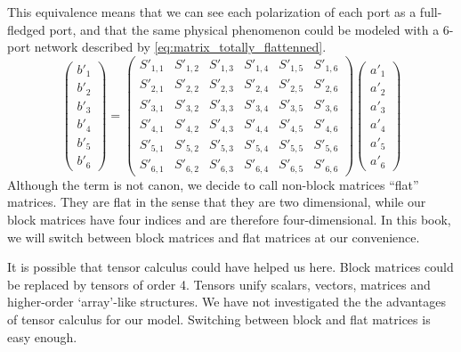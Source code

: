 This equivalence means that we can see each polarization of each port as a full-fledged port, and that the same physical phenomenon could be modeled with a 6-port network described by \cref{eq:matrix_totally_flattenned}.
\begin{equation}
    \begin{pmatrix}
        b'_1 \\ b'_2 \\ b'_3 \\ b'_{4} \\ b'_{5} \\ b'_{6}
    \end{pmatrix}
    =
    \begin{pmatrix}
        S'_{1, 1} & S'_{1, 2} & S'_{1, 3} & S'_{1, 4} & S'_{1, 5} & S'_{1, 6} \\
        S'_{2, 1} & S'_{2, 2} & S'_{2, 3} & S'_{2, 4} & S'_{2, 5} & S'_{2, 6} \\
        S'_{3, 1} & S'_{3, 2} & S'_{3, 3} & S'_{3, 4} & S'_{3, 5} & S'_{3, 6} \\
        S'_{4, 1} & S'_{4, 2} & S'_{4, 3} & S'_{4, 4} & S'_{4, 5} & S'_{4, 6} \\
        S'_{5, 1} & S'_{5, 2} & S'_{5, 3} & S'_{5, 4} & S'_{5, 5} & S'_{5, 6} \\
        S'_{6, 1} & S'_{6, 2} & S'_{6, 3} & S'_{6, 4} & S'_{6, 5} & S'_{6, 6}
    \end{pmatrix}
    \begin{pmatrix}
        a'_1 \\ a'_2 \\ a'_3 \\ a'_{4} \\ a'_{5} \\ a'_{6}
    \end{pmatrix}
    \label{eq:matrix_totally_flattenned}
\end{equation}
Although the term is not canon, we decide to call non-block matrices ``flat'' matrices.
They are flat in the sense that they are two dimensional, while our block matrices have four indices and are therefore four-dimensional.
In this book, we will switch between block matrices and flat matrices at our convenience.

It is possible that tensor calculus could have helped us here.
Block matrices could be replaced by tensors of order 4.
Tensors unify scalars, vectors, matrices and higher-order `array'-like structures.
We have not investigated the the advantages of tensor calculus for our model.
Switching between block and flat matrices is easy enough.


